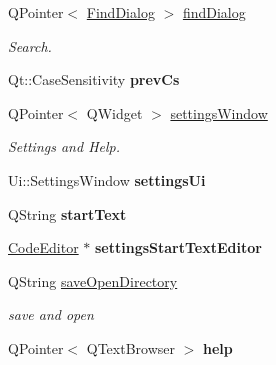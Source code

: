 \begin{DoxyCompactItemize}
\item 
\hypertarget{class_main_window_a940ef509338a6eb9a8fd88b744444528}{}Q\+Pointer$<$ \hyperlink{class_find_dialog}{Find\+Dialog} $>$ \hyperlink{class_main_window_a940ef509338a6eb9a8fd88b744444528}{find\+Dialog}\label{class_main_window_a940ef509338a6eb9a8fd88b744444528}

\begin{DoxyCompactList}\small\item\em Search. \end{DoxyCompactList}\item 
\hypertarget{class_main_window_a4675f0ccc7830548cdb633bd7d203311}{}Qt\+::\+Case\+Sensitivity {\bfseries prev\+Cs}\label{class_main_window_a4675f0ccc7830548cdb633bd7d203311}

\item 
\hypertarget{class_main_window_aa26c478fd01dfb62f25cea707f46828f}{}Q\+Pointer$<$ Q\+Widget $>$ \hyperlink{class_main_window_aa26c478fd01dfb62f25cea707f46828f}{settings\+Window}\label{class_main_window_aa26c478fd01dfb62f25cea707f46828f}

\begin{DoxyCompactList}\small\item\em Settings and Help. \end{DoxyCompactList}\item 
\hypertarget{class_main_window_addb2c09eaa063aafb1a199f0ccdfe58a}{}Ui\+::\+Settings\+Window {\bfseries settings\+Ui}\label{class_main_window_addb2c09eaa063aafb1a199f0ccdfe58a}

\item 
\hypertarget{class_main_window_a4c0f162aea1aef936ce3cd6568d744d9}{}Q\+String {\bfseries start\+Text}\label{class_main_window_a4c0f162aea1aef936ce3cd6568d744d9}

\item 
\hypertarget{class_main_window_a017ec0eacfb8f3a4bc7656e75adb3610}{}\hyperlink{class_code_editor}{Code\+Editor} $\ast$ {\bfseries settings\+Start\+Text\+Editor}\label{class_main_window_a017ec0eacfb8f3a4bc7656e75adb3610}

\item 
\hypertarget{class_main_window_a314ff864f3e545e033898d3d4f136d52}{}Q\+String \hyperlink{class_main_window_a314ff864f3e545e033898d3d4f136d52}{save\+Open\+Directory}\label{class_main_window_a314ff864f3e545e033898d3d4f136d52}

\begin{DoxyCompactList}\small\item\em save and open \end{DoxyCompactList}\item 
\hypertarget{class_main_window_a0198da4de1adda89a1418a87168f66c6}{}Q\+Pointer$<$ Q\+Text\+Browser $>$ {\bfseries help}\label{class_main_window_a0198da4de1adda89a1418a87168f66c6}


\end{DoxyCompactItemize}
